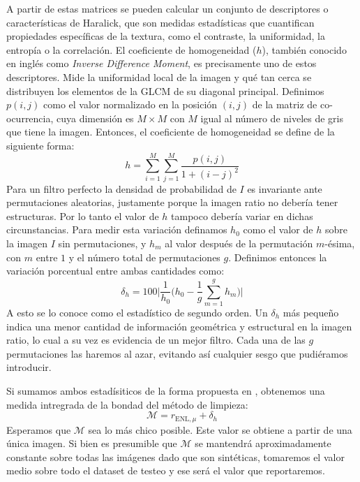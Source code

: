 A partir de estas matrices se pueden calcular un conjunto de descriptores o características de Haralick, que son medidas estadísticas que cuantifican propiedades específicas de la textura, como el contraste, la uniformidad, la entropía o la correlación. El coeficiente de homogeneidad ($h$), también conocido en inglés como \emph{Inverse Difference Moment}, es precisamente uno de estos descriptores. Mide la uniformidad local de la imagen y qué tan cerca se distribuyen los elementos de la GLCM de su diagonal principal. Definimos $p(i,j)$ como el valor normalizado en la posición $(i, j)$ de la matriz de co-ocurrencia, cuya dimensión es $M\times M$ con $M$ igual al número de niveles de gris que tiene la imagen. Entonces, el coeficiente de homogeneidad se define de la siguiente forma:
\begin{equation}
    h = \sum_{i=1}^{M}\sum_{j=1}^{M}\frac{p(i,j)}{1+(i-j)^2}
\end{equation}
Para un filtro perfecto la densidad de probabilidad de $I$ es invariante ante permutaciones aleatorias, justamente porque la imagen ratio no debería tener estructuras. Por lo tanto el valor de $h$ tampoco debería variar en dichas circunstancias. Para medir esta variación definamos $h_0$ como el valor de $h$ sobre la imagen $I$ sin permutaciones, y $h_m$ al valor después de la permutación $m$-ésima, con $m$ entre $1$ y el número total de permutaciones $g$. Definimos entonces la variación porcentual entre ambas cantidades como:
\begin{equation}
    \delta_h = 100\Bigg| \frac{1}{h_0} \Bigg( h_0 - \frac{1}{g}\sum_{m=1}^{g} h_m \Bigg) \Bigg|
\end{equation}
A esto se lo conoce como el estadístico de segundo orden. Un $\delta_h$ más pequeño indica una menor cantidad de información geométrica y estructural en la imagen ratio, lo cual a su vez es evidencia de un mejor filtro. Cada una de las $g$ permutaciones las haremos al azar, evitando así cualquier sesgo que pudiéramos introducir.

Si sumamos ambos estadísiticos de la forma propuesta en \cite{gomez2017unassisted}, obtenemos una medida intregrada de la bondad del método de limpieza:
\begin{equation}
    \mathcal{M} = r_{\text{ENL},\mu} + \delta_h
\end{equation}
Esperamos que $\mathcal{M}$ sea lo más chico posible. Este valor se obtiene a partir de una única imagen. Si bien es presumible que $\mathcal{M}$ se mantendrá aproximadamente constante sobre todas las imágenes dado que son sintéticas, tomaremos el valor medio sobre todo el dataset de testeo y ese será el valor que reportaremos.

